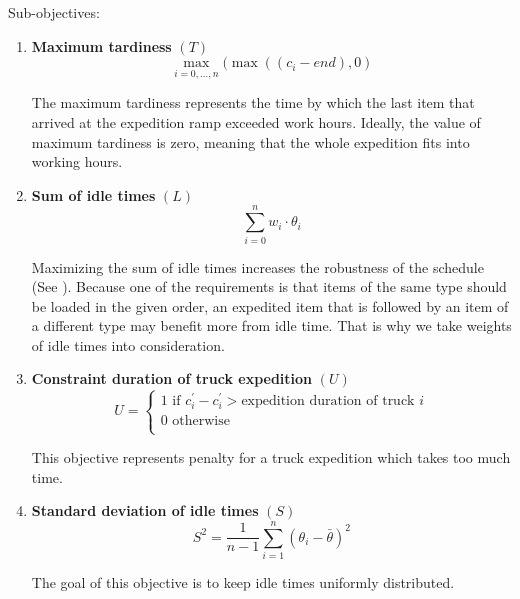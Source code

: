 \documentclass{ctuthesis}
\begin{document}
Sub-objectives:

\begin{enumerate}
\item \textbf{Maximum tardiness} $(T)$\\ \begin{equation}\max_{i=0,\ldots,n}(\max((c_i - end), 0)\end{equation}

The maximum tardiness represents the time by which the last item that arrived at the expedition ramp exceeded work hours. Ideally, the value of maximum tardiness is zero, meaning that the whole expedition fits into working hours.

\item \textbf{Sum of idle times} $(L)$\\ 
\begin{equation}
    \sum_{i=0}^{n} w_i \cdot \theta_i
\end{equation}

Maximizing the sum of idle times increases the robustness of the schedule (See \cite{pinedo}). Because one of the requirements is that items of the same type should be loaded in the given order, an expedited item that is followed by an item of a different type may benefit more from idle time. That is why we take weights of idle times into consideration.

\item \textbf{Constraint duration of truck expedition} $(U)$
\begin{equation} 
   U = \begin{cases}
        1 \text{ if } c_i^{'} - c_i^{'} > \text{expedition duration of truck } i\\
        \text{0 otherwise}\\
       \end{cases}
\end{equation}

This objective represents penalty for a truck expedition which takes too much time.

\item \textbf{Standard deviation of idle times} $(S)$
\begin{equation} 
    S^2=\frac{1}{n-1}\sum_{i=1}^{n} (\theta_{i} -\bar{\theta})^2 
\end{equation}

The goal of this objective is to keep idle times uniformly distributed. 

\end{enumerate}
 
\end{document}

